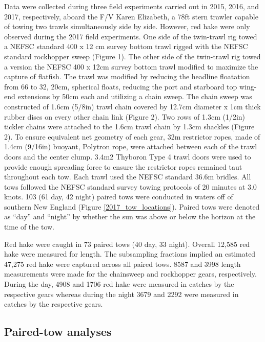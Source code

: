 \documentclass[12pt,letterpaper, leqno]{article}
\begin{document}
Data were collected during three field experiments carried out in 2015, 2016, and 2017, respectively, aboard the F/V Karen Elizabeth, a 78ft stern trawler capable of towing two trawls simultaneously side by side. However, red hake were only observed during the 2017 field experiments. One side of the twin-trawl rig towed a NEFSC standard 400 x 12 cm survey bottom trawl rigged with the NEFSC standard rockhopper sweep \citep[]{politisetal14} (Figure 1). The other side of the twin-trawl rig towed a version the NEFSC 400 x 12cm survey bottom trawl modified to maximize the capture of flatfish. The trawl was modified by reducing the headline floatation from 66 to 32, 20cm, spherical floats, reducing the port and starboard top wing-end extensions by 50cm each and utilizing a chain sweep. The chain sweep was constructed of 1.6cm (5/8in) trawl chain covered by 12.7cm diameter x 1cm thick rubber discs on every other chain link (Figure 2). Two rows of 1.3cm (1/2in) tickler chains were attached to the 1.6cm trawl chain by 1.3cm shackles (Figure 2). To ensure equivalent net geometry of each gear, 32m restrictor ropes, made of 1.4cm (9/16in) buoyant, Polytron rope, were attached between each of the trawl doors and the center clump. 3.4m2 Thyboron Type 4 trawl doors were used to provide enough spreading force to ensure the restrictor ropes remained taut throughout each tow. Each trawl used the NEFSC standard 36.6m bridles. All tows followed the NEFSC standard survey towing protocols of 20 minutes at 3.0 knots. 103 (61 day, 42 night) paired tows were conducted in waters off of southern New England (Figure \ref{2017_tow_locations}).  Paired tows were denoted as ``day'' and ``night''  by whether the sun was above or below the horizon at the time of the tow. 

Red hake were caught in 73 paired tows (40 day, 33 night). Overall 12,585  red hake were measured for length. The subsampling fractions implied an estimated 47,275 red hake were captured across all paired tows. 8587 and 3998 length measurements were made for the chainsweep and rockhopper gears, respectively.  During the day, 4908 and 1706 red hake were measured in catches by the respective gears whereas during the night 3679 and 2292 were measured in catches by the respective gears.

\subsection*{Paired-tow analyses}
\end{document}
